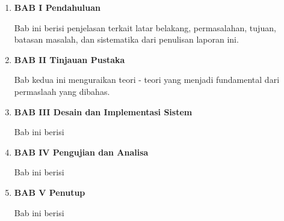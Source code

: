 \begin{enumerate}[nolistsep]

  \item \textbf{BAB I Pendahuluan}

  Bab ini berisi penjelasan terkait latar belakang, permasalahan, tujuan, batasan masalah, dan sistematika dari penulisan laporan ini.

  \vspace{2ex}

  \item \textbf{BAB II Tinjauan Pustaka}

  Bab kedua ini menguraikan teori - teori yang menjadi fundamental dari permaslaah yang dibahas.

  \vspace{2ex}

  \item \textbf{BAB III Desain dan Implementasi Sistem}

  Bab ini berisi \lipsum[4][1-5]

  \vspace{2ex}

  \item \textbf{BAB IV Pengujian dan Analisa}

  Bab ini berisi \lipsum[5][1-5]

  \vspace{2ex}

  \item \textbf{BAB V Penutup}

  Bab ini berisi \lipsum[6][1-5]

\end{enumerate}
